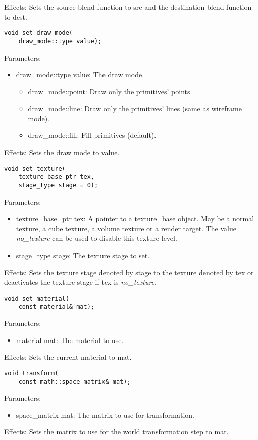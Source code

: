 \documentclass{article}
\begin{document}
Effects: Sets the source blend function to src and the destination blend function to dest.

\begin{lstlisting}
void set_draw_mode(
	draw_mode::type value);
\end{lstlisting}
Parameters:
\begin{itemize}
\item draw\_mode::type value: The draw mode.
  \begin{itemize}
  \item draw\_mode::point: Draw only the primitives' points.
  \item draw\_mode::line: Draw only the primitives' lines (same as wireframe mode).
  \item draw\_mode::fill: Fill primitives (default).
  \end{itemize}
\end{itemize}
Effects: Sets the draw mode to value.

\begin{lstlisting}
void set_texture(
	texture_base_ptr tex,
	stage_type stage = 0);
\end{lstlisting}
Parameters:
\begin{itemize}
\item texture\_base\_ptr tex: A pointer to a texture\_base object. May be a normal texture, a cube texture, a volume texture or a render target.
The value \emph{no\_texture} can be used to disable this texture level.
\item stage\_type stage: The texture stage to set.
\end{itemize}
Effects: Sets the texture stage denoted by stage to the texture denoted by tex or deactivates the texture stage if tex is \emph{no\_texture}.

\begin{lstlisting}
void set_material(
	const material& mat);
\end{lstlisting}
Parameters:
\begin{itemize}
\item material mat: The material to use.
\end{itemize}
Effects: Sets the current material to mat.

\begin{lstlisting}
void transform(
	const math::space_matrix& mat);
\end{lstlisting}
Parameters:
\begin{itemize}
\item space\_matrix mat: The matrix to use for transformation.
\end{itemize}
Effects: Sets the matrix to use for the world transformation step to mat.
\end{document}
